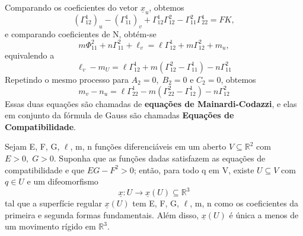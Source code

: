 \documentclass[../differential_geometry.tex]{subfiles}
\begin{document}
Comparando os coeficientes do vetor \(\underline{x}_{u}\), obtemos
\[
	(\Gamma_{12}^{1})_{u} - (\Gamma_{11}^{1})_{v} + \Gamma_{12}^{1}\Gamma_{12}^{2}-\Gamma_{11}^{2}\Gamma_{22}^{1}=FK,
\]
e comparando coeficientes de N, obtém-se
\[
	m\Phi_{11}^{2}+n\Gamma_{11}^{2} + \ell_{v} = \ell \Gamma_{12}^{1} + m \Gamma_{12}^{2} + m_{u},
\]
equivalendo a
\[
	\boxed{\ell_{v}-m_{U} = \ell \Gamma_{12}^{1} + m (\Gamma_{12}^{2}-\Gamma_{11}^{1}) - n \Gamma_{11}^{2}}
\]
Repetindo o mesmo processo para \(A_{2} = 0,\; B_{2}=0\) e \(C_{2} = 0\), obtemos
\[
	\boxed{m_{v}-n_{u}=\ell \Gamma_{22}^{1}-m(\Gamma_{22}^{2}-\Gamma_{12}^{1})-n\Gamma_{12}^{2}}
\]
Essas duas equações são chamadas de \textbf{equações de Mainardi-Codazzi}, e elas em conjunto da fórmula de Gauss são chamadas \hypertarget{compatibility_equations}{\textbf{Equações de Compatibilidade}}.
\hypertarget{bonnet_theorem}{\begin{theorem*}
		Sejam E, F, G, \(\ell\), m, n funções diferenciáveis em um aberto \(V\subseteq \mathbb{R}^{2}\) com \(E> 0,\; G>0\). Suponha que as funções dadas satisfazem as equações de compatibilidade e que \(EG-F^{2}>0\); então, para todo q em V, existe \(U\subseteq V\) com \(q\in U\) e um difeomorfismo
		\[
			\underline{x}:U\rightarrow \underline{x}(U)\subseteq \mathbb{R}^{3}
		\]
		tal que a superfície regular \(\underline{x}(U)\) tem E, F, G, \(\ell\), m, n como os coeficientes da primeira e segunda formas fundamentais. Além disso, \(\underline{x}(U)\) é única a menos de um movimento rígido em \(\mathbb{R}^{3}\).
	\end{theorem*}}
\end{document}

